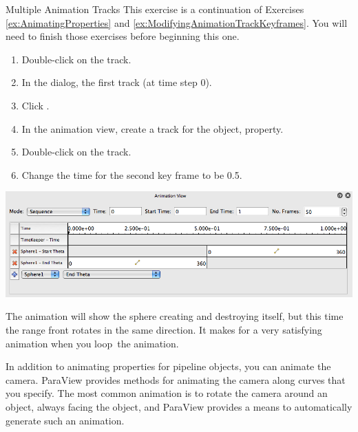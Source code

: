 \begin{exercise}{Multiple Animation Tracks}
  \label{ex:MultipleAnimationTracks}%
  This exercise is a continuation of Exercises \ref{ex:AnimatingProperties}
  and \ref{ex:ModifyingAnimationTrackKeyframes}.  You will need to finish
  those exercises before beginning this one.

  \begin{enumerate}
  \item Double-click on the  track.
  \item In the  dialog,  the first
    track (at time step 0).
  \item Click .
  \item In the animation view, create a track for the  object,
     property.
  \item Double-click on the  track.
  \item Change the time for the second key frame to be 0.5.
  \end{enumerate}

  \begin{inlinefig}
    \includegraphics[width=.9\linewidth]{images/BuildAnimation3}
  \end{inlinefig}

  The animation will show the sphere creating and destroying itself, but this
  time the range front rotates in the same direction.  It makes for a very
  satisfying animation when you loop~\vcrLoop the animation.
\end{exercise}

In addition to animating properties for pipeline objects, you can animate
the camera.  ParaView provides methods for animating the camera along
curves that you specify.  The most common animation is to rotate the camera
around an object, always facing the object, and ParaView provides a means
to automatically generate such an animation.

